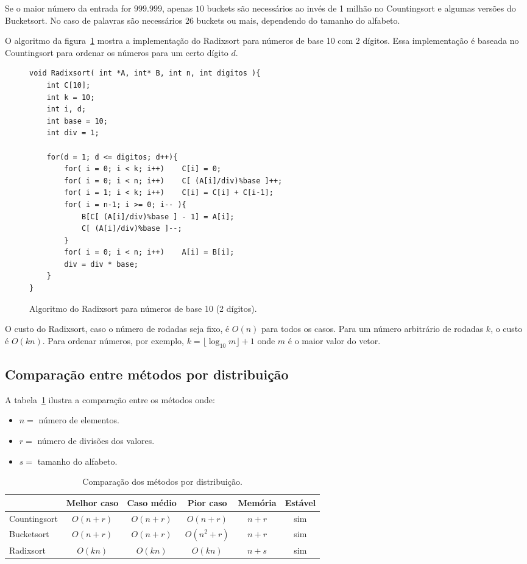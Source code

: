 Se o maior número da entrada for $999.999$, apenas $10$ buckets são necessários
ao invés de 1 milhão no Countingsort e algumas versões do Bucketsort.
No caso de palavras são necessários $26$ buckets ou mais, dependendo do tamanho
do alfabeto.

O algoritmo da figura~\ref{aula03:algo:radix} mostra a implementação do Radixsort
para números de base 10 com 2 dígitos.
Essa implementação é baseada no Countingsort para ordenar os números para um certo
dígito $d$.
%
\begin{figure}[!htb]
\centering
\begin{framed}
\begin{lstlisting}
void Radixsort( int *A, int* B, int n, int digitos ){
	int C[10];
	int k = 10;
	int i, d;
	int base = 10;
	int div = 1;

	for(d = 1; d <= digitos; d++){
		for( i = 0; i < k; i++)    C[i] = 0;
		for( i = 0; i < n; i++)    C[ (A[i]/div)%base ]++;
		for( i = 1; i < k; i++)    C[i] = C[i] + C[i-1];
		for( i = n-1; i >= 0; i-- ){
			B[C[ (A[i]/div)%base ] - 1] = A[i];
			C[ (A[i]/div)%base ]--;
		}
		for( i = 0; i < n; i++)    A[i] = B[i];
		div = div * base;
	}
}
\end{lstlisting}
\end{framed}
\caption{Algoritmo do Radixsort para números de base 10 (2 dígitos).}
\label{aula03:algo:radix}
\end{figure}

O custo do Radixsort, caso o número de rodadas seja fixo, é $O(n)$ para todos os casos.
Para um número arbitrário de rodadas $k$, o custo é $O(k n)$.
Para ordenar números, por exemplo, $k = \lfloor \log_{10} m \rfloor + 1$ onde
$m$ é o maior valor do vetor.

\subsection{Comparação entre métodos por distribuição}

A tabela~\ref{aula03:tab:cmp:dist} ilustra a comparação entre os métodos onde:
\begin{itemize}
\item $n = $ número de elementos.
\item $r = $ número de divisões dos valores.
\item $s = $ tamanho do alfabeto.
\end{itemize}
%
\begin{table}[!ht]
\centering
\caption{Comparação dos métodos por distribuição.}
\begin{tabular}{lccccc}
\hline
          & Melhor caso & Caso médio & Pior caso & Memória & Estável \\ \hline
Countingsort & $O(n+r)$ & $O(n+r)$ & $O(n+r)$   & $n+r$ & sim \\ \hline
Bucketsort   & $O(n+r)$ & $O(n+r)$ & $O(n^2+r)$ & $n+r$ & sim \\ \hline
Radixsort    & $O(k n)$ & $O(k n)$ & $O(k n)$   & $n+s$ & sim \\ \hline
%
\end{tabular}
\label{aula03:tab:cmp:dist}
\end{table}

